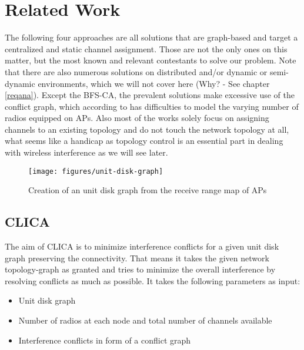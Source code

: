 \chapter{Related Work}
  The following four approaches are all solutions that are graph-based and target a centralized and static channel assignment.
  Those are not the only ones on this matter, but the most known and relevant contestants to solve our problem.
  Note that there are also numerous solutions on distributed and/or dynamic or semi-dynamic environments, which we will not cover here (Why? - See chapter \ref{reqana}).
  Except the BFS-CA, the prevalent solutions make excessive use of the conflict graph, which according to \cite{overview_caa} has difficulties to model 
  the varying number of radios equipped on APs. Also most of the works solely focus on assigning channels to an existing topology and do not touch 
  the network topology at all, what seems like a handicap as topology control is an essential part in dealing with wireless interference as we will see later.
  
  \begin{figure}[h!]
    \centering
    \texttt{[image: figures/unit-disk-graph]}
    \caption{Creation of an unit disk graph from the receive range map of APs}
    \label{fig:unit-disk-graph}
  \end{figure}
  
  \section{\ac{CLICA}}
    The aim of \ac{CLICA} \cite{CLICA} is to minimize interference conflicts for a given unit disk graph preserving the connectivity.
    That means it takes the given network topology-graph as granted and tries to minimize the overall interference by resolving conflicts as much as possible.
    It takes the following parameters as input:
    
    \begin{itemize}
      \item Unit disk graph
      
      \item Number of radios at each node and total number of channels available
      
      \item Interference conflicts in form of a conflict graph
    \end{itemize}
    
